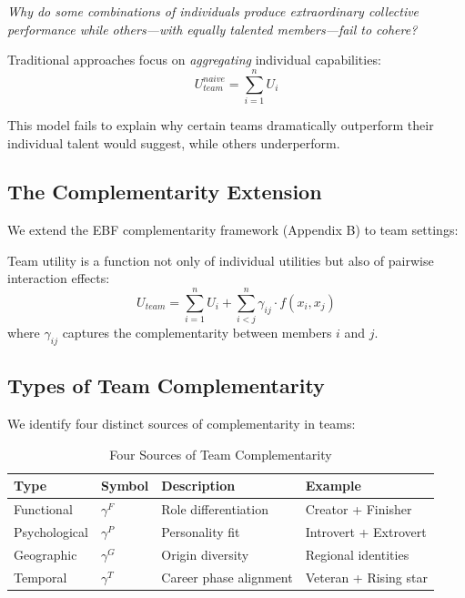 \begin{tcolorbox}[colback=yellow!10!white, colframe=yellow!50!black, title=Fundamental Question]
\textit{Why do some combinations of individuals produce extraordinary collective
performance while others—with equally talented members—fail to cohere?}
\end{tcolorbox}

Traditional approaches focus on \textit{aggregating} individual capabilities:
\begin{equation}
U_{team}^{naive} = \sum_{i=1}^{n} U_i
\end{equation}

This model fails to explain why certain teams dramatically outperform their
individual talent would suggest, while others underperform.

\subsection{The Complementarity Extension}

We extend the EBF complementarity framework (Appendix B) to team settings:

\begin{axiom}
\label{ax:team-comp}
Team utility is a function not only of individual utilities but also of
pairwise interaction effects:
\begin{equation}
U_{team} = \sum_{i=1}^{n} U_i + \sum_{i<j}^{n} \gamma_{ij} \cdot f(x_i, x_j)
\end{equation}
where $\gamma_{ij}$ captures the complementarity between members $i$ and $j$.
\end{axiom}

\subsection{Types of Team Complementarity}

We identify four distinct sources of complementarity in teams:

\begin{table}[h]
\centering
\caption{Four Sources of Team Complementarity}
\label{tab:comp-sources}
\begin{tabular}{llll}
\toprule
\textbf{Type} & \textbf{Symbol} & \textbf{Description} & \textbf{Example} \\
\midrule
Functional & $\gamma^{F}$ & Role differentiation & Creator + Finisher \\
Psychological & $\gamma^{P}$ & Personality fit & Introvert + Extrovert \\
Geographic & $\gamma^{G}$ & Origin diversity & Regional identities \\
Temporal & $\gamma^{T}$ & Career phase alignment & Veteran + Rising star \\
\bottomrule
\end{tabular}
\end{table}

